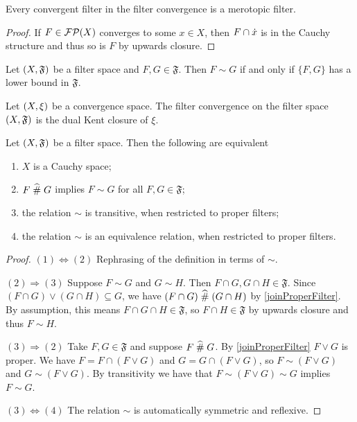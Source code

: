 \begin{lemma}
Every convergent filter in the filter convergence is a merotopic filter.
\end{lemma}
\begin{proof}
If $F\in \operatorname{\mathcal{FP}}(X)$ converges to some $x\in X$, then $F\cap \dot{x}$ is in the Cauchy structure and thus so is $F$ by upwards closure.
\end{proof}

\begin{lemma}
Let $\sSet{X, \mathfrak{F}}$ be a filter space and $F,G\in \mathfrak{F}$. Then $F\sim G$ \textup{if and only if} $\{F, G\}$ has a lower bound in $\mathfrak{F}$.
\end{lemma}

\begin{lemma}
Let $\sSet{X,\xi}$ be a convergence space. The filter convergence on the filter space $\sSet{X,\mathfrak{F}}$ is the dual Kent closure of $\xi$.
\end{lemma}

\begin{lemma} \label{CauchyEquivalence}
Let $\sSet{X, \mathfrak{F}}$ be a filter space. Then the following are equivalent
\begin{enumerate}
\item $X$ is a Cauchy space;
\item $F\mathrel{\widehat{\#}} G$ implies $F\sim G$ for all $F,G\in \mathfrak{F}$;
\item the relation $\sim$ is transitive, when restricted to proper filters;
\item the relation $\sim$ is an equivalence relation, when restricted to proper filters.
\end{enumerate}
\end{lemma}
\begin{proof}
$(1) \Leftrightarrow (2)$ Rephrasing of the definition in terms of $\sim$.

$(2) \Rightarrow (3)$ Suppose $F\sim G$ and $G\sim H$. Then $F\cap G, G\cap H\in\mathfrak{F}$. Since $(F\cap G)\vee (G\cap H) \subseteq G$, we have $(F\cap G)\mathrel{\widehat{\#}} (G\cap H)$ by \ref{joinProperFilter}. By assumption, this means $F\cap G\cap H \in \mathfrak{F}$, so $F\cap H\in \mathfrak{F}$ by upwards closure and thus $F\sim H$.

$(3) \Rightarrow (2)$ Take $F,G\in\mathfrak{F}$ and suppose $F\mathrel{\widehat{\#}} G$. By \ref{joinProperFilter} $F\vee G$ is proper. We have $F = F\cap (F\vee G)$ and $G = G\cap (F\vee G)$, so $F \sim (F\vee G)$ and $G\sim (F\vee G)$. By transitivity we have that $F\sim (F\vee G)\sim G$ implies $F\sim G$.

$(3) \Leftrightarrow (4)$ The relation $\sim$ is automatically symmetric and reflexive.
\end{proof}

